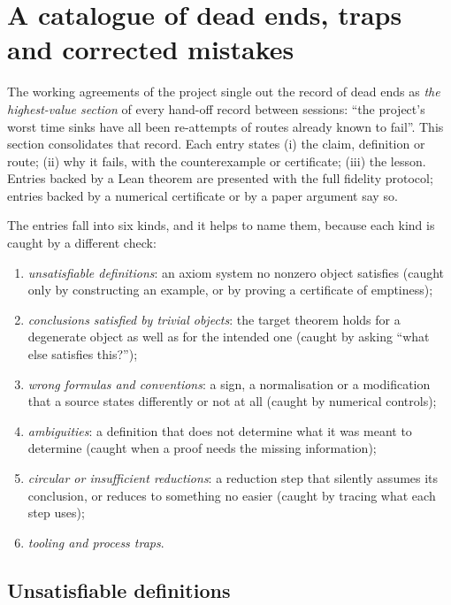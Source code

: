 \section{A catalogue of dead ends, traps and corrected mistakes}\label{ch15:sec:deadends}

The working agreements of the project single out the record of dead ends as \emph{the
highest-value section} of every hand-off record between sessions: ``the project's worst time sinks have all been
re-attempts of routes already known to fail''. This section consolidates that record. Each entry
states (i) the claim, definition or route; (ii) why it fails, with the counterexample or
certificate; (iii) the lesson. Entries backed by a Lean theorem are presented with the full
fidelity protocol; entries backed by a numerical certificate or by a paper argument say so.

The entries fall into six kinds, and it helps to name them, because each kind is caught by a
different check:
\begin{enumerate}[label=(\Alph*)]
\item \emph{unsatisfiable definitions}: an axiom system no nonzero object satisfies (caught only by
  constructing an example, or by proving a certificate of emptiness);
\item \emph{conclusions satisfied by trivial objects}: the target theorem holds for a degenerate
  object as well as for the intended one (caught by asking ``what else satisfies this?'');
\item \emph{wrong formulas and conventions}: a sign, a normalisation or a modification that a
  source states differently or not at all (caught by numerical controls);
\item \emph{ambiguities}: a definition that does not determine what it was meant to determine
  (caught when a proof needs the missing information);
\item \emph{circular or insufficient reductions}: a reduction step that silently assumes its
  conclusion, or reduces to something no easier (caught by tracing what each step uses);
\item \emph{tooling and process traps}.
\end{enumerate}

\subsection{Unsatisfiable definitions}

